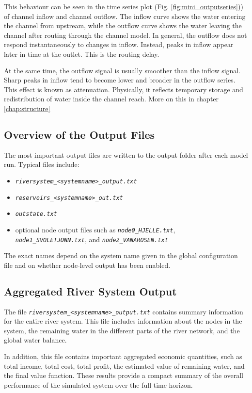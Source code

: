 \documentclass[a4paper, 12pt]{report}
\newcommand{\file}[1]{\textit{\texttt{#1}}}  %
\begin{document}
	This behaviour can be seen in the time series plot (Fig. \ref{fig:mini_outputseries})) of channel inflow and channel outflow. The inflow curve shows the water entering the channel from upstream, while the outflow curve shows the water leaving the channel after routing through the channel model. In general, the outflow does not respond instantaneously to changes in inflow. Instead, peaks in inflow appear later in time at the outlet. This is the routing delay.

	At the same time, the outflow signal is usually smoother than the inflow signal. Sharp peaks in inflow tend to become lower and broader in the outflow series. This effect is known as attenuation. Physically, it reflects temporary storage and redistribution of water inside the channel reach. More on this in chapter \ref{chap:structure}


	\subsection{Overview of the Output Files}

	The most important output files are written to the output folder after each model run. Typical files include:

	\begin{itemize}
		\item \file{riversystem\_<systemname>\_output.txt}
		\item \file{reservoirs\_<systemname>\_out.txt}
		\item \file{outstate.txt}
		\item optional node output files such as \file{node0\_HJELLE.txt}, \file{node1\_SVOLETJONN.txt}, and \file{node2\_VANAROSEN.txt}
	\end{itemize}

	The exact names depend on the system name given in the global configuration file and on whether node-level output has been enabled.

	\subsection{Aggregated River System Output}

	The file \file{riversystem\_<systemname>\_output.txt} contains summary information for the entire river system. This file includes information about the nodes in the system, the remaining water in the different parts of the river network, and the global water balance.

	In addition, this file contains important aggregated economic quantities, such as total income, total cost, total profit, the estimated value of remaining water, and the final value function. These results provide a compact summary of the overall performance of the simulated system over the full time horizon.
\end{document}
